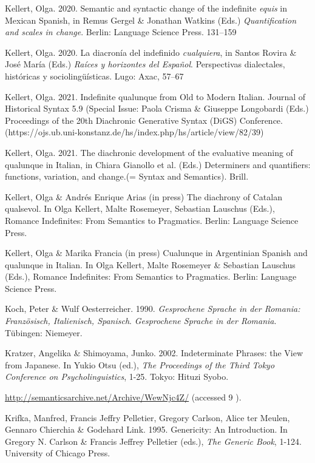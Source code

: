 \documentclass[output=paper]{langscibook}
\begin{document}
Kellert, Olga. 2020. Semantic and syntactic change of the indefinite \textit{equis} in Mexican Spanish, in Remus Gergel \& Jonathan Watkins (Eds.) \textit{Quantification and scales in change}. Berlin: Language Science Press. 131–159

Kellert, Olga. 2020. La diacronía del indefinido \textit{cualquiera}, in Santos Rovira \& José María (Eds.) \textit{Raíces y horizontes del Español}. Perspectivas dialectales, históricas y sociolingüísticas. Lugo: Axac, 57–67 

Kellert, Olga. 2021. Indefinite qualunque from Old to Modern Italian. Journal of Historical Syntax 5.9 (Special Issue: Paola Crisma \& Giuseppe Longobardi (Eds.) Proceedings of the 20th Diachronic Generative Syntax (DiGS) Conference. (https://ojs.ub.uni-konstanz.de/hs/index.php/hs/article/view/82/39)

Kellert, Olga. 2021. The diachronic development of the evaluative meaning of qualunque in Italian, in Chiara Gianollo et al. (Eds.) Determiners and quantifiers: functions, variation, and change.(= Syntax and Semantics). Brill.

Kellert, Olga \& Andrés Enrique Arias (in press) The diachrony of Catalan qualsevol. In Olga Kellert, Malte Rosemeyer, Sebastian Lauschus (Eds.), Romance Indefinites: From Semantics to Pragmatics. Berlin: Language Science Press.

Kellert, Olga \& Marika Francia (in press) Cualunque in Argentinian Spanish and qualunque in Italian. In Olga Kellert, Malte Rosemeyer \& Sebastian Lauschus (Eds.), Romance Indefinites: From Semantics to Pragmatics. Berlin: Language Science Press.

Koch, Peter \& Wulf Oesterreicher. 1990. \textit{Gesprochene Sprache in der Romania: Französisch, Italienisch, Spanisch}. \textit{Gesprochene Sprache in der Romania}. Tübingen: Niemeyer.

Kratzer, Angelika \& Shimoyama, Junko. 2002. Indeterminate Phrases: the View from Japanese. In Yukio Otsu (ed.), \textit{The Proceedings of the Third Tokyo Conference on Psycholinguistics}, 1-25. Tokyo: Hituzi Syobo.

  \url{http://semanticsarchive.net/Archive/WewNjc4Z/}{ (accessed 9 \citealt{April2021}).}

Krifka, Manfred, Francis Jeffry Pelletier, Gregory Carlson, Alice ter Meulen, Gennaro Chierchia \& Godehard Link. 1995. Genericity: An Introduction. In Gregory N. Carlson \& Francis Jeffrey Pelletier (eds.), \textit{The Generic Book}, 1-124. University of Chicago Press.
\end{document}
